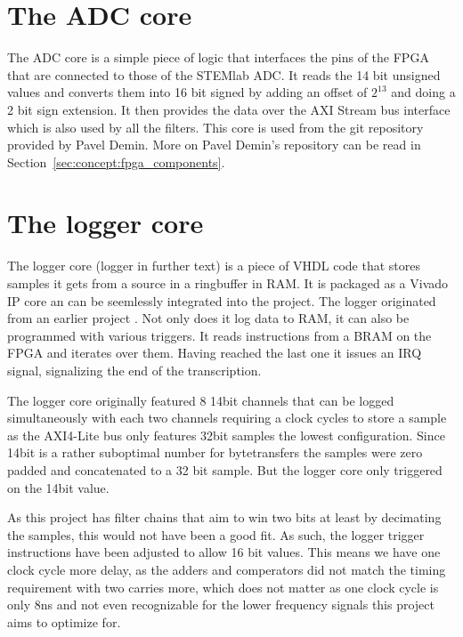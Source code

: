 \section{The ADC core}
\label{sec:fpga:adc}

The ADC core is a simple piece of logic that interfaces the pins of the FPGA that are connected to those of the STEMlab ADC. It reads the 14 bit unsigned values and converts them into 16 bit signed by adding an offset of $2^{13}$ and doing a 2 bit sign extension.
It then provides the data over the AXI Stream bus interface which is also used by all the filters.
This core is used from the git repository provided by Pavel Demin\cite{TODO:link}. More on Pavel Demin's repository can be read in Section~\ref{sec:concept:fpga_components}.

\section{The logger core}
\label{sec:fpga:logger}

The logger core (logger in further text) is a piece of VHDL code that stores samples it gets from a source in a ringbuffer in RAM. It is packaged as a Vivado IP core an can be seemlessly integrated into the project.
The logger originated from an earlier project \cite{TODO:}. Not only does it log data to RAM, it can also be programmed with various triggers. It reads instructions from a BRAM on the FPGA and iterates over them. Having reached the last one it issues an IRQ signal, signalizing the end of the transcription.

The logger core originally featured 8 14bit channels that can be logged simultaneously with each two channels requiring a clock cycles to store a sample as the AXI4-Lite bus only features 32bit samples the lowest configuration.
Since 14bit is a rather suboptimal number for bytetransfers the samples were zero padded and concatenated to a 32 bit sample.
But the logger core only triggered on the 14bit value.

As this project has filter chains that aim to win two bits at least by decimating the samples, this would not have been a good fit.
As such, the logger trigger instructions have been adjusted to allow 16 bit values.
This means we have one clock cycle more delay, as the adders and comperators did not match the timing requirement with two carries more, which does not matter as one clock cycle is only 8ns and not even recognizable for the lower frequency signals this project aims to optimize for.

